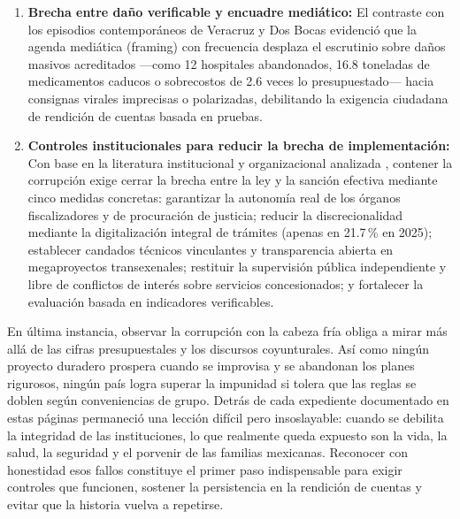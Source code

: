 \begin{enumerate}
  \item \textbf{Brecha entre daño verificable y encuadre mediático:} El contraste con los episodios contemporáneos de Veracruz y Dos Bocas evidenció que la agenda mediática (framing) con frecuencia desplaza el escrutinio sobre daños masivos acreditados ---como 12 hospitales abandonados, 16.8 toneladas de medicamentos caducos o sobrecostos de 2.6 veces lo presupuestado--- hacia consignas virales imprecisas o polarizadas, debilitando la exigencia ciudadana de rendición de cuentas basada en pruebas.
  
  \item \textbf{Controles institucionales para reducir la brecha de implementación:} Con base en la literatura institucional y organizacional analizada \citep{arellano2012,casar2024,lopezayllon2009,merino2024,ocde2017,peschard2017}, contener la corrupción exige cerrar la brecha entre la ley y la sanción efectiva mediante cinco medidas concretas: garantizar la autonomía real de los órganos fiscalizadores y de procuración de justicia; reducir la discrecionalidad mediante la digitalización integral de trámites (apenas en 21.7\,\% en 2025); establecer candados técnicos vinculantes y transparencia abierta en megaproyectos transexenales; restituir la supervisión pública independiente y libre de conflictos de interés sobre servicios concesionados; y fortalecer la evaluación basada en indicadores verificables.
\end{enumerate}

En última instancia, observar la corrupción con la cabeza fría obliga a mirar más allá de las cifras presupuestales y los discursos coyunturales. Así como ningún proyecto duradero prospera cuando se improvisa y se abandonan los planes rigurosos, ningún país logra superar la impunidad si tolera que las reglas se doblen según conveniencias de grupo. Detrás de cada expediente documentado en estas páginas permaneció una lección difícil pero insoslayable: cuando se debilita la integridad de las instituciones, lo que realmente queda expuesto son la vida, la salud, la seguridad y el porvenir de las familias mexicanas. Reconocer con honestidad esos fallos constituye el primer paso indispensable para exigir controles que funcionen, sostener la persistencia en la rendición de cuentas y evitar que la historia vuelva a repetirse.